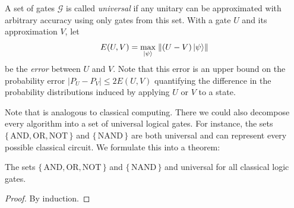 	\begin{definition}
		A set of gates \(\mathcal{G}\) is called \emph{universal} if any unitary can be approximated with arbitrary accuracy using only gates from this set. With a gate \(U\) and its approximation \(V\), let
		\begin{equation}
			E(U, V) = \max_{\ket{\psi}}\; \lVert (U - V) \ket{\psi} \rVert
		\end{equation}
		be the \emph{error} between \(U\) and \(V\). Note that this error is an upper bound on the probability error \( \lvert P_U - P_V \rvert \leq 2 E(U, V) \) quantifying the difference in the probability distributions induced by applying \(U\) or \(V\) to a state.
	\end{definition}

	Note that is analogous to classical computing. There we could also decompose every algorithm into a set of universal logical gates. For instance, the sets \( \{\, \text{AND}, \text{OR}, \text{NOT} \,\} \) and \( \{\, \text{NAND} \,\} \) are both universal and can represent every possible classical circuit. We formulate this into a theorem:

	\begin{theorem}  \label{th:classicalUniversal}
		The sets \( \{\, \text{AND}, \text{OR}, \text{NOT} \,\} \) and \( \{\, \text{NAND} \,\} \) and universal for all classical logic gates.
	\end{theorem}
	\begin{proof}
		By induction.
	\end{proof}

